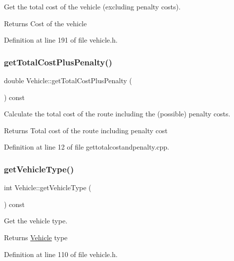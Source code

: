 Get the total cost of the vehicle (excluding penalty costs). \begin{DoxyReturn}{Returns}
Cost of the vehicle 
\end{DoxyReturn}


Definition at line 191 of file vehicle.\+h.

\mbox{\label{class_vehicle_a57dd3fc27076f460d4cac3b750aeb011}} 
\subsubsection{\texorpdfstring{get\+Total\+Cost\+Plus\+Penalty()}{getTotalCostPlusPenalty()}}
{\footnotesize\ttfamily double Vehicle\+::get\+Total\+Cost\+Plus\+Penalty (\begin{DoxyParamCaption}{ }\end{DoxyParamCaption}) const}

Calculate the total cost of the route including the (possible) penalty costs. \begin{DoxyReturn}{Returns}
Total cost of the route including penalty cost 
\end{DoxyReturn}


Definition at line 12 of file gettotalcostandpenalty.\+cpp.

\mbox{\label{class_vehicle_a6d561e79b80d8335c2b1d61b0a00ab55}} 
\subsubsection{\texorpdfstring{get\+Vehicle\+Type()}{getVehicleType()}}
{\footnotesize\ttfamily int Vehicle\+::get\+Vehicle\+Type (\begin{DoxyParamCaption}{ }\end{DoxyParamCaption}) const\hspace{0.3cm}{\ttfamily [inline]}}

Get the vehicle type. \begin{DoxyReturn}{Returns}
\hyperlink{class_vehicle}{Vehicle} type 
\end{DoxyReturn}


Definition at line 110 of file vehicle.\+h.

